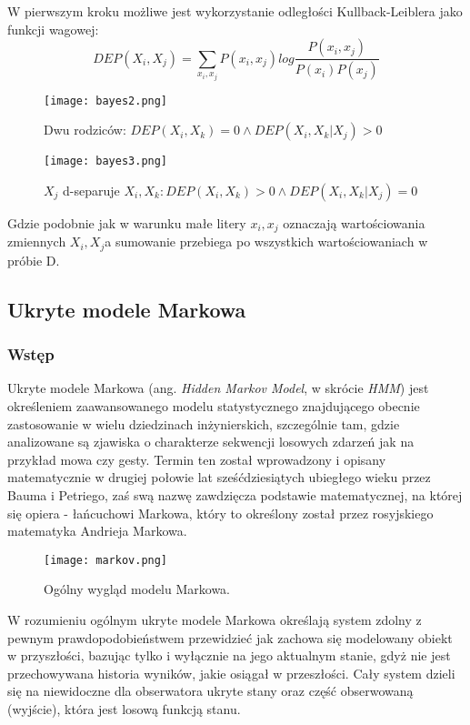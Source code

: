W pierwszym kroku możliwe jest wykorzystanie odległości Kullback-Leiblera jako funkcji wagowej:
$$ DEP(X_{i}, X_{j}) = \sum_{x_{i}, x_{j}}^{ }  P(x_{i}, x_{j}) log \frac{P(x_{i}, x_{j})}{P(x_{i})P(x_{j})} $$

\begin{figure}[h!]
	\centering
	\texttt{[image: bayes2.png]}
	\label{bayes2}
	\caption{Dwu rodziców: \(DEP(X_{i},X_{k}) = 0 \wedge DEP(X_{i},X_{k}|X_{j}) > 0\)}
\end{figure}

\begin{figure}[h!]
	\centering
	\texttt{[image: bayes3.png]}
	\label{bayes3}
	\caption{\( X_{j}\) d-separuje \(X_{i},X_{k}:DEP(X_{i},X_{k})>0 \wedge DEP(X_{i},X_{k}|X_{j})=0\)}
\end{figure}

Gdzie podobnie jak w warunku małe litery \(x_{i}, x_{j}\) oznaczają wartościowania zmiennych \(X_{i}, X_{j} \)a sumowanie przebiega po wszystkich wartościowaniach w próbie D.

\newpage
\newpage

\subsection{Ukryte modele Markowa}

\subsubsection{Wstęp}

Ukryte modele Markowa (ang. \textit{Hidden Markov Model}, w skrócie \textit{HMM}) jest określeniem zaawansowanego modelu statystycznego znajdującego obecnie zastosowanie w wielu dziedzinach inżynierskich, szczególnie tam, gdzie analizowane są zjawiska o charakterze sekwencji losowych zdarzeń jak na przykład mowa czy gesty. Termin ten został wprowadzony i opisany matematycznie w drugiej połowie lat sześćdziesiątych ubiegłego wieku przez Bauma i Petriego, zaś swą nazwę zawdzięcza podstawie matematycznej, na której się opiera - łańcuchowi Markowa, który to określony został przez rosyjskiego matematyka Andrieja Markowa.

\begin{wrapfigure}{R}{0.5\textwidth}
  \centering
  \texttt{[image: markov.png]}
  \caption{\label{fig:markov}Ogólny wygląd modelu Markowa.}
\end{wrapfigure}

W rozumieniu ogólnym ukryte modele Markowa określają system zdolny z pewnym prawdopodobieństwem przewidzieć jak zachowa się modelowany obiekt w przyszłości, bazując tylko i wyłącznie na jego aktualnym stanie, gdyż nie jest przechowywana historia wyników, jakie osiągał w przeszłości. Cały system dzieli się na niewidoczne dla obserwatora ukryte stany oraz część obserwowaną (wyjście), która jest losową funkcją stanu.

